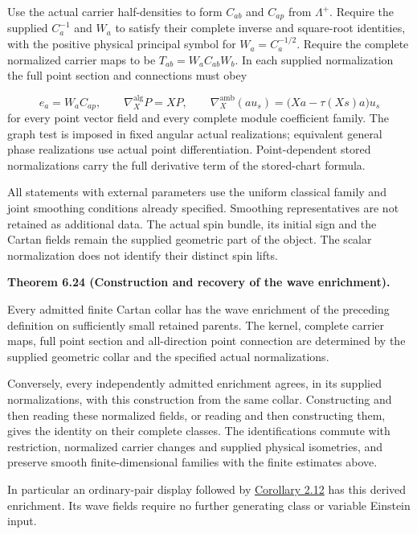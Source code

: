 \documentclass[
  english,
  11pt,
  reqno]{amsart}
\makeatletter
\newcommand{\pandocstatementheading}[1]{%
  \par\addpenalty{\@beginparpenalty}%
  \addvspace{.5\baselineskip plus .2\baselineskip minus .2\baselineskip}%
  {\normalfont\bfseries #1\par}%
  \nobreak\@afterindenttrue\@afterheading
}
\makeatother
\begin{document}
Use the actual carrier half-densities to form \(C_{ab}\) and \(C_{ap}\)
from \(\Lambda^+\). Require the supplied \(C_a^{-1}\) and \(W_a\) to
satisfy their complete inverse and square-root identities, with the
positive physical principal symbol for \(W_a=C_a^{-1/2}\). Require the
complete normalized carrier maps to be \(T_{ab}=W_aC_{ab}W_b\). In each
supplied normalization the full point section and connections must obey

\label{eq:online-independent-enrichment-section-connection-tests}
\[
e_a=W_aC_{ap},\qquad
\nabla_X^{\mathrm{alg}}P=XP,\qquad
\nabla_X^{\mathrm{amb}}(a u_s)
=\bigl(Xa-\tau(Xs)a\bigr)u_s
\] for every point vector field and every complete module coefficient
family. The graph test is imposed in fixed angular actual realizations;
equivalent general phase realizations use actual point differentiation.
Point-dependent stored normalizations carry the full derivative term of
the stored-chart formula.

All statements with external parameters use the uniform classical family
and joint smoothing conditions already specified. Smoothing
representatives are not retained as additional data. The actual spin
bundle, its initial sign and the Cartan fields remain the supplied
geometric part of the object. The scalar normalization does not identify
their distinct spin lifts.

\pandocstatementheading{\leavevmode{}\label{thm:online-wave-enrichment-recognition}Theorem 6.24 (Construction and recovery of the wave enrichment).}

Every admitted finite Cartan collar has the wave enrichment of the
preceding definition on sufficiently small retained parents. The kernel,
complete carrier maps, full point section and all-direction point
connection are determined by the supplied geometric collar and the
specified actual normalizations.

Conversely, every independently admitted enrichment agrees, in its
supplied normalizations, with this construction from the same collar.
Constructing and then reading these normalized fields, or reading and
then constructing them, gives the identity on their complete classes.
The identifications commute with restriction, normalized carrier changes
and supplied physical isometries, and preserve smooth finite-dimensional
families with the finite estimates above.

In particular an ordinary-pair display followed by
\hyperref[cor:online-ordinary-pair-cartan-collar]{Corollary 2.12} has
this derived enrichment. Its wave fields require no further generating
class or variable Einstein input.
\end{document}
